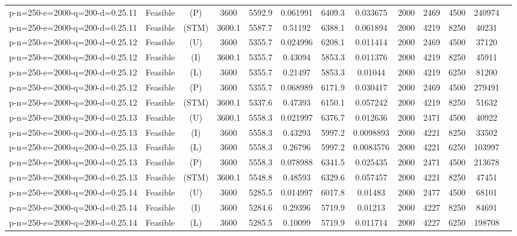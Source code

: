 \documentclass[landscape, a4paper]{article}
\newcommand{\STM}{\ensuremath{\mathrm{STM}}}
\newcommand{\Improved}{\ensuremath{\mathrm{I}}}
\newcommand{\Loose}{\ensuremath{\mathrm{L}}}
\newcommand{\Profit}{\ensuremath{\mathrm{P}}}
\newcommand{\Utility}{\ensuremath{\mathrm{U}}}
\begin{document}
\begin{center}
\begin{tabular}{lcccccccccccc}
p-n=250-e=2000-q=200-d=0.25.11 & Feasible & (\Profit) & 3600 & 5592.9 & 0.061991 & 6409.3 & 0.033675 & 2000 & 2469 & 4500 & 240974 & \\
p-n=250-e=2000-q=200-d=0.25.11 & Feasible & (\STM) & 3600.1 & 5587.7 & 0.51192 & 6388.1 & 0.061894 & 2000 & 4219 & 8250 & 40231 & \\
p-n=250-e=2000-q=200-d=0.25.12 & Feasible & (\Utility) & 3600 & 5355.7 & 0.024996 & 6208.1 & 0.011414 & 2000 & 2469 & 4500 & 37120 & \\
p-n=250-e=2000-q=200-d=0.25.12 & Feasible & (\Improved) & 3600.1 & 5355.7 & 0.43094 & 5853.3 & 0.011376 & 2000 & 4219 & 8250 & 45911 & \\
p-n=250-e=2000-q=200-d=0.25.12 & Feasible & (\Loose) & 3600 & 5355.7 & 0.21497 & 5853.3 & 0.01044 & 2000 & 4219 & 6250 & 81200 & \\
p-n=250-e=2000-q=200-d=0.25.12 & Feasible & (\Profit) & 3600 & 5355.7 & 0.068989 & 6171.9 & 0.030417 & 2000 & 2469 & 4500 & 279491 & \\
p-n=250-e=2000-q=200-d=0.25.12 & Feasible & (\STM) & 3600.1 & 5337.6 & 0.47393 & 6150.1 & 0.057242 & 2000 & 4219 & 8250 & 51632 & \\
p-n=250-e=2000-q=200-d=0.25.13 & Feasible & (\Utility) & 3600.1 & 5558.3 & 0.021997 & 6376.7 & 0.012636 & 2000 & 2471 & 4500 & 40922 & \\
p-n=250-e=2000-q=200-d=0.25.13 & Feasible & (\Improved) & 3600 & 5558.3 & 0.43293 & 5997.2 & 0.0098893 & 2000 & 4221 & 8250 & 33502 & \\
p-n=250-e=2000-q=200-d=0.25.13 & Feasible & (\Loose) & 3600 & 5558.3 & 0.26796 & 5997.2 & 0.0083576 & 2000 & 4221 & 6250 & 103997 & \\
p-n=250-e=2000-q=200-d=0.25.13 & Feasible & (\Profit) & 3600 & 5558.3 & 0.078988 & 6341.5 & 0.025435 & 2000 & 2471 & 4500 & 213678 & \\
p-n=250-e=2000-q=200-d=0.25.13 & Feasible & (\STM) & 3600.1 & 5548.8 & 0.48593 & 6329.6 & 0.057457 & 2000 & 4221 & 8250 & 47451 & \\
p-n=250-e=2000-q=200-d=0.25.14 & Feasible & (\Utility) & 3600 & 5285.5 & 0.014997 & 6017.8 & 0.01483 & 2000 & 2477 & 4500 & 68101 & \\
p-n=250-e=2000-q=200-d=0.25.14 & Feasible & (\Improved) & 3600 & 5284.6 & 0.29396 & 5719.9 & 0.01213 & 2000 & 4227 & 8250 & 84691 & \\
p-n=250-e=2000-q=200-d=0.25.14 & Feasible & (\Loose) & 3600 & 5285.5 & 0.10099 & 5719.9 & 0.011714 & 2000 & 4227 & 6250 & 198708 & \\

\end{tabular}
\end{center}
\end{document}
